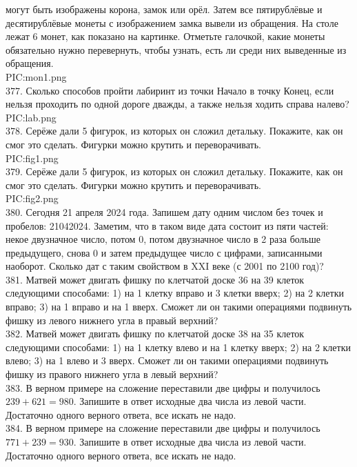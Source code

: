 могут быть изображены корона, замок или орёл. Затем все пятирублёвые и десятирублёвые монеты
с изображением замка вывели из обращения. На столе лежат 6 монет, как показано на картинке.
Отметьте галочкой, какие монеты обязательно нужно перевернуть, чтобы узнать, есть ли среди них
выведенные из обращения.\\
{{PIC:mon1.png}}\\
377. Сколько способов пройти лабиринт из точки Начало в точку Конец, если нельзя проходить по одной дороге
дважды, а также нельзя ходить справа налево?\\
{{PIC:lab.png}}\\
378. Серёже дали 5 фигурок, из которых он сложил детальку. Покажите, как он смог это сделать.
Фигурки можно крутить и переворачивать.\\
{{PIC:fig1.png}}\\
379. Серёже дали 5 фигурок, из которых он сложил детальку. Покажите, как он смог это сделать.
Фигурки можно крутить и переворачивать.\\
{{PIC:fig2.png}}\\
380.  Сегодня 21 апреля 2024 года. Запишем дату одним числом без точек и пробелов: 21042024.
Заметим, что в таком виде дата состоит из пяти частей: некое двузначное число, потом 0, потом
двузначное число в 2 раза больше предыдущего, снова 0 и затем предыдущее число с цифрами,
записанными наоборот. Сколько дат с таким свойством в XXI веке (с 2001 по 2100 год)?\\
381. Матвей может двигать фишку по клетчатой доске 36 на 39 клеток следующими способами:
1) на 1 клетку вправо и 3 клетки вверх; 2) на 2 клетки вправо; 3) на 1 вправо и на 1 вверх.
Сможет ли он такими операциями подвинуть фишку из левого нижнего угла в правый верхний?\\
382.  Матвей может двигать фишку по клетчатой доске 38 на 35 клеток следующими способами:
1) на 1 клетку влево и на 1 клетку вверх; 2) на 2 клетки влево; 3) на 1 влево и 3 вверх.
Сможет ли он такими операциями подвинуть фишку из правого нижнего угла в левый верхний?\\
383. В верном примере на сложение переставили две цифры и получилось $239+621=980.$ Запишите в ответ исходные два числа из левой части. Достаточно одного верного ответа, все искать не надо.\\
384. В верном примере на сложение переставили две цифры и получилось $771+239=930.$ Запишите в ответ исходные два числа из левой части. Достаточно одного верного ответа, все искать не надо.\\
